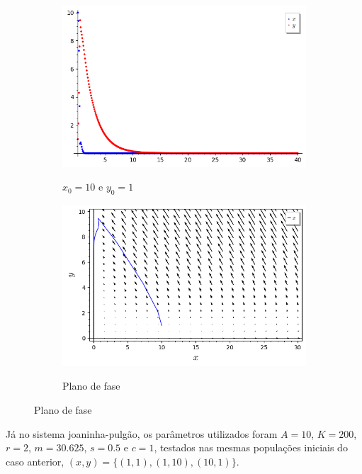 \begin{figure}[H]
    \centering
    \begin{subfigure}{0.4\textwidth}
        \includegraphics[scale=0.48]{figuras/RM-cana (10,1) plot.png}
        \label{fig:RM-cana_5}
        \caption{$x_0 = 10$ e $y_0 = 1$}
    \end{subfigure}
    \begin{subfigure}{0.4\textwidth}
        \includegraphics[scale=0.48]{figuras/RM-cana (10,1) plano.png}
        \label{fig:RM-cana_6}
        \caption{Plano de fase}
    \end{subfigure}
\end{figure}

Já no sistema joaninha-pulgão, os parâmetros utilizados foram $A=10$, $K=200$, $r=2$, $m=30.625$, $s=0.5$ e $c=1$, testados nas mesmas populações iniciais do caso anterior, $(x,y)=\{(1,1),(1,10),(10,1)\}$.

